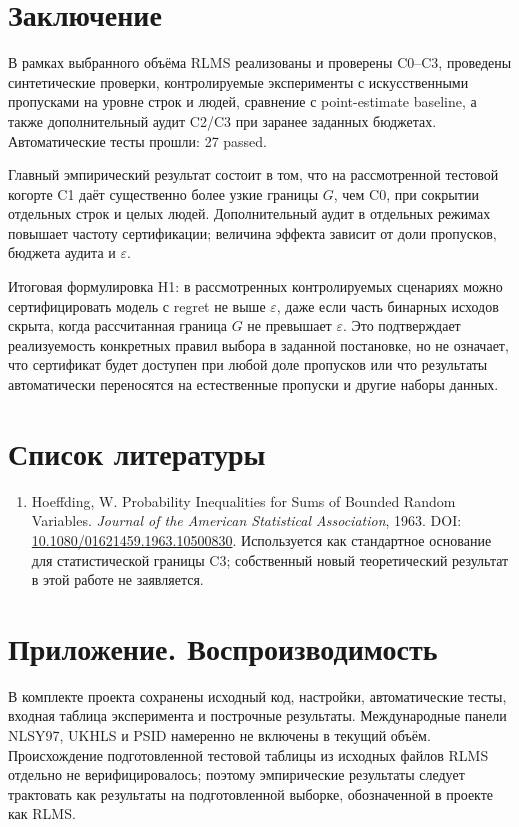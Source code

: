 \documentclass[12pt,a4paper]{article}
\begin{document}
\section{Заключение}
В рамках выбранного объёма RLMS реализованы и проверены C0--C3, проведены синтетические проверки, контролируемые эксперименты с искусственными пропусками на уровне строк и людей, сравнение с point-estimate baseline, а также дополнительный аудит C2/C3 при заранее заданных бюджетах. Автоматические тесты прошли: 27 passed.

Главный эмпирический результат состоит в том, что на рассмотренной тестовой когорте C1 даёт существенно более узкие границы $G$, чем C0, при сокрытии отдельных строк и целых людей. Дополнительный аудит в отдельных режимах повышает частоту сертификации; величина эффекта зависит от доли пропусков, бюджета аудита и $\varepsilon$.

Итоговая формулировка H1: в рассмотренных контролируемых сценариях можно сертифицировать модель с regret не выше $\varepsilon$, даже если часть бинарных исходов скрыта, когда рассчитанная граница $G$ не превышает $\varepsilon$. Это подтверждает реализуемость конкретных правил выбора в заданной постановке, но не означает, что сертификат будет доступен при любой доле пропусков или что результаты автоматически переносятся на естественные пропуски и другие наборы данных.

\section*{Список литературы}
\begin{enumerate}
\item Hoeffding, W. Probability Inequalities for Sums of Bounded Random Variables. \textit{Journal of the American Statistical Association}, 1963. DOI: \href{https://doi.org/10.1080/01621459.1963.10500830}{10.1080/01621459.1963.10500830}. Используется как стандартное основание для статистической границы C3; собственный новый теоретический результат в этой работе не заявляется.
\end{enumerate}

\section*{Приложение. Воспроизводимость}
\sloppy
В комплекте проекта сохранены исходный код, настройки, автоматические тесты, входная таблица эксперимента и построчные результаты. Международные панели NLSY97, UKHLS и PSID намеренно не включены в текущий объём. Происхождение подготовленной тестовой таблицы из исходных файлов RLMS отдельно не верифицировалось; поэтому эмпирические результаты следует трактовать как результаты на подготовленной выборке, обозначенной в проекте как RLMS.
\end{document}

